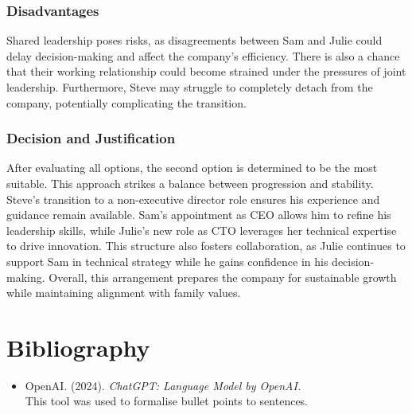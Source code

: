 \documentclass[a4paper,10pt]{article}
\begin{document}
\subsubsection*{Disadvantages}
Shared leadership poses risks, as disagreements between Sam and Julie could delay decision-making and affect the company’s efficiency. There is also a chance that their working relationship could become strained under the pressures of joint leadership. Furthermore, Steve may struggle to completely detach from the company, potentially complicating the transition.

\subsubsection*{Decision and Justification}

After evaluating all options, the second option is determined to be the most suitable. This approach strikes a balance between progression and stability. Steve’s transition to a non-executive director role ensures his experience and guidance remain available. Sam’s appointment as CEO allows him to refine his leadership skills, while Julie’s new role as CTO leverages her technical expertise to drive innovation. This structure also fosters collaboration, as Julie continues to support Sam in technical strategy while he gains confidence in his decision-making. Overall, this arrangement prepares the company for sustainable growth while maintaining alignment with family values.

\section*{Bibliography}\nocite{*}

\begin{itemize}
    \item OpenAI. (2024). \textit{ChatGPT: Language Model by OpenAI.} \\ 
    This tool was used to formalise bullet points to sentences.
\end{itemize}
\end{document}
